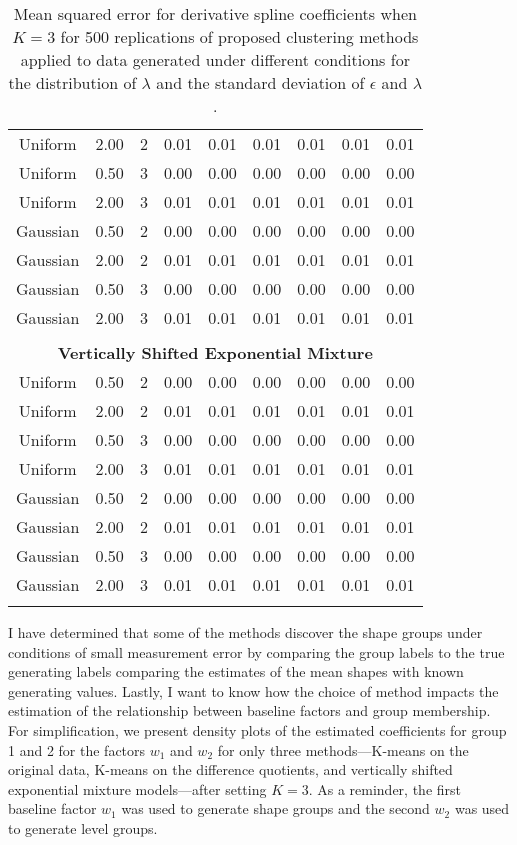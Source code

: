 \begin{table}[ht]
\begin{tabular}{ccc|cccccc}
  Uniform & 2.00 &   2 & 0.01 & 0.01 & 0.01 & 0.01 & 0.01 & 0.01 \\ 
  Uniform & 0.50 &   3 & 0.00 & 0.00 & 0.00 & 0.00 & 0.00 & 0.00 \\ 
  Uniform & 2.00 &   3 & 0.01 & 0.01 & 0.01 & 0.01 & 0.01 & 0.01 \\ 
  Gaussian & 0.50 &   2 & 0.00 & 0.00 & 0.00 & 0.00 & 0.00 & 0.00 \\ 
  Gaussian & 2.00 &   2 & 0.01 & 0.01 & 0.01 & 0.01 & 0.01 & 0.01 \\ 
  Gaussian & 0.50 &   3 & 0.00 & 0.00 & 0.00 & 0.00 & 0.00 & 0.00 \\ 
  Gaussian & 2.00 &   3 & 0.01 & 0.01 & 0.01 & 0.01 & 0.01 & 0.01 \\ 
   \\ \multicolumn{9}{c}{\textbf{Vertically Shifted Exponential Mixture}}\\Uniform & 0.50 &   2 & 0.00 & 0.00 & 0.00 & 0.00 & 0.00 & 0.00 \\ 
  Uniform & 2.00 &   2 & 0.01 & 0.01 & 0.01 & 0.01 & 0.01 & 0.01 \\ 
  Uniform & 0.50 &   3 & 0.00 & 0.00 & 0.00 & 0.00 & 0.00 & 0.00 \\ 
  Uniform & 2.00 &   3 & 0.01 & 0.01 & 0.01 & 0.01 & 0.01 & 0.01 \\ 
  Gaussian & 0.50 &   2 & 0.00 & 0.00 & 0.00 & 0.00 & 0.00 & 0.00 \\ 
  Gaussian & 2.00 &   2 & 0.01 & 0.01 & 0.01 & 0.01 & 0.01 & 0.01 \\ 
  Gaussian & 0.50 &   3 & 0.00 & 0.00 & 0.00 & 0.00 & 0.00 & 0.00 \\ 
  Gaussian & 2.00 &   3 & 0.01 & 0.01 & 0.01 & 0.01 & 0.01 & 0.01 \\ 
   \thickhline\end{tabular}
\caption{Mean squared error for derivative spline coefficients when $K=3$ for 500 replications of proposed clustering methods applied to data generated under different conditions for the distribution of $\lambda$ and the standard deviation of $\epsilon$ and $\lambda$.}
\label{tab:mse3}

\end{table}
I have determined that some of the methods discover the shape groups under conditions of small measurement error by comparing the group labels to the true generating labels comparing the estimates of the mean shapes with known generating values. Lastly, I want to know how the choice of method impacts the estimation of the relationship between baseline factors and group membership. For simplification, we present density plots of the estimated coefficients for group 1 and 2 for the factors $w_{1}$ and $w_{2}$ for only three methods---K-means on the original data, K-means on the difference quotients, and vertically shifted exponential mixture models---after setting $K=3$. As a reminder, the first baseline factor $w_{1}$ was used to generate shape groups and the second $w_{2}$ was used to generate level groups. 

